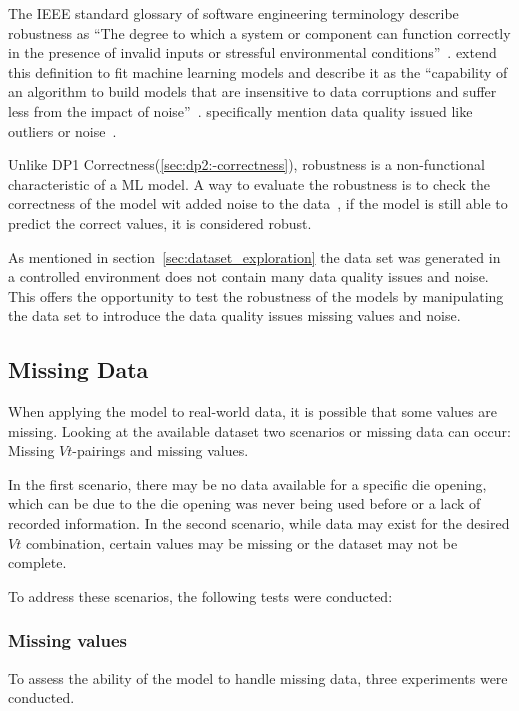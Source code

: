 The IEEE standard glossary of software engineering terminology describe
robustness as ``The degree
to which a system or component can function correctly in the presence of
invalid inputs or
stressful environmental conditions''~\cite[p. 64]{terminology1990ieee}.
\cite{saez2016evaluating} extend this definition to fit machine learning
models and describe it
as the ``capability of an algorithm to build models that are insensitive to
data corruptions and
suffer less from the impact of noise''~\cite[p.
2]{saez_evaluatingclassifierbehavior_2016}.
\cite{siebert2022construction} specifically mention data quality issued like
outliers or
noise~\cite[p. 16]{siebert2022construction}.

Unlike DP1 Correctness(\ref{sec:dp2:-correctness}), robustness is a
non-functional characteristic
of a \ac{ML} model.
A way to evaluate the robustness is to check the correctness of the model wit
added noise to the data~\cite[p. 18]{zhou_machinelearning_2021}, if the model
is still able to
predict the correct values, it is considered robust.

As mentioned in section~\ref{sec:dataset_exploration} the data set
was generated in a controlled environment does not contain many data quality
issues and noise.
This offers the opportunity to test the robustness of the models by
manipulating the data set
to introduce the data quality issues missing values and noise.

\subsection{Missing Data}\label{subsec:missing-data}
When applying the model to real-world data, it is possible that some values
are missing.
Looking at the available dataset two scenarios or missing data can occur:
Missing \(Vt\)-pairings
and missing values.

In the first scenario, there may be no data available for a specific die
opening, which can be due to the die opening was never being used before or a
lack of recorded
information.
In the second scenario, while data may exist for the desired \(Vt\)
combination, certain values may
be missing or the dataset may not be complete.

To address these scenarios, the following tests were conducted:

\subsubsection{Missing values}
To assess the ability of the model to handle missing data, three experiments were
conducted.


